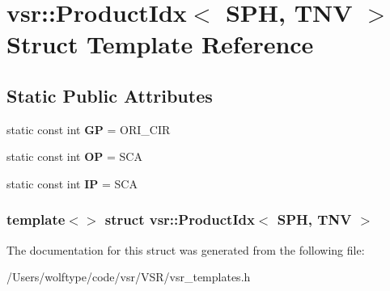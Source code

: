 \hypertarget{structvsr_1_1_product_idx_3_01_s_p_h_00_01_t_n_v_01_4}{\section{vsr\-:\-:Product\-Idx$<$ S\-P\-H, T\-N\-V $>$ Struct Template Reference}
\label{structvsr_1_1_product_idx_3_01_s_p_h_00_01_t_n_v_01_4}
}
\subsection*{Static Public Attributes}
\begin{DoxyCompactItemize}
\item 
\hypertarget{structvsr_1_1_product_idx_3_01_s_p_h_00_01_t_n_v_01_4_af64442987218f08001844c5019f1199d}{static const int {\bfseries G\-P} = O\-R\-I\-\_\-\-C\-I\-R}\label{structvsr_1_1_product_idx_3_01_s_p_h_00_01_t_n_v_01_4_af64442987218f08001844c5019f1199d}

\item 
\hypertarget{structvsr_1_1_product_idx_3_01_s_p_h_00_01_t_n_v_01_4_a25cfa879215c81a2713bf0730e22f60b}{static const int {\bfseries O\-P} = S\-C\-A}\label{structvsr_1_1_product_idx_3_01_s_p_h_00_01_t_n_v_01_4_a25cfa879215c81a2713bf0730e22f60b}

\item 
\hypertarget{structvsr_1_1_product_idx_3_01_s_p_h_00_01_t_n_v_01_4_a628d4fc36661876a46e512462e896f64}{static const int {\bfseries I\-P} = S\-C\-A}\label{structvsr_1_1_product_idx_3_01_s_p_h_00_01_t_n_v_01_4_a628d4fc36661876a46e512462e896f64}

\end{DoxyCompactItemize}
\subsubsection*{template$<$$>$ struct vsr\-::\-Product\-Idx$<$ S\-P\-H, T\-N\-V $>$}



The documentation for this struct was generated from the following file\-:\begin{DoxyCompactItemize}
\item 
/\-Users/wolftype/code/vsr/\-V\-S\-R/vsr\-\_\-templates.\-h\end{DoxyCompactItemize}
